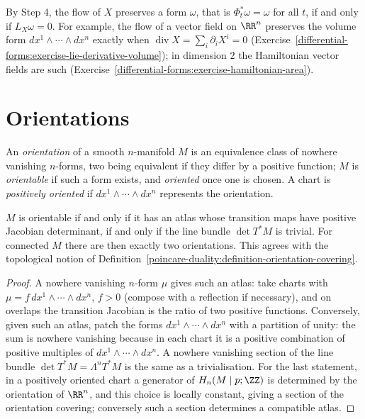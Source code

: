 By Step 4, the flow of $X$ preserves a form $\omega$, that is $\Phi_t^*\omega = \omega$ for all $t$, if and only if $L_X\omega = 0$. For example, the flow of a vector field on $\RR^n$
preserves the volume form $dx^1 \wedge \cdots \wedge dx^n$ exactly when $\operatorname{div}X = \sum_i\partial_iX^i = 0$
(Exercise~\ref{differential-forms:exercise-lie-derivative-volume}); in dimension $2$ the Hamiltonian vector fields are such
(Exercise~\ref{differential-forms:exercise-hamiltonian-area}).

\section{Orientations}\label{differential-forms:section-orientations}

\begin{definition}\label{differential-forms:definition-orientation}
An \emph{orientation} of a smooth $n$-manifold $M$ is an equivalence class of nowhere vanishing $n$-forms, two being equivalent if they differ by a positive function; $M$ is \emph{orientable} if such a
form exists, and \emph{oriented} once one is chosen. A chart is \emph{positively oriented} if $dx^1 \wedge \cdots \wedge dx^n$ represents the orientation.
\end{definition}

\begin{proposition}\label{differential-forms:proposition-orientation}
$M$ is orientable if and only if it has an atlas whose transition maps have positive Jacobian determinant, if and only if the line bundle $\det T^*M$ is trivial. For connected $M$ there are then exactly two
orientations. This agrees with the topological notion of Definition~\ref{poincare-duality:definition-orientation-covering}.
\end{proposition}

\begin{proof}
A nowhere vanishing $n$-form $\mu$ gives such an atlas: take charts with $\mu = f\,dx^1 \wedge \cdots \wedge dx^n$, $f > 0$ (compose with a reflection if necessary), and on overlaps the transition Jacobian is
the ratio of two positive functions. Conversely, given such an atlas, patch the forms $dx^1 \wedge \cdots \wedge dx^n$ with a partition of unity: the sum is nowhere vanishing because in each chart it is a
positive combination of positive multiples of $dx^1 \wedge \cdots \wedge dx^n$. A nowhere vanishing section of the line bundle $\det T^*M = \Lambda^nT^*M$ is the same as a trivialisation. For the last
statement, in a positively oriented chart a generator of $H_n(M \mid p; \ZZ)$ is determined by the orientation of $\RR^n$, and this choice is locally constant, giving a section of the orientation covering;
conversely such a section determines a compatible atlas.
\end{proof}

